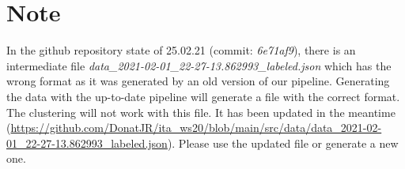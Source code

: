 \section{Note}
In the github repository state of 25.02.21 (commit: \textit{6e71af9}), there is an intermediate file \textit{data\_2021-02-01\_22-27-13.862993\_labeled.json} which has the wrong format as it was generated by an old version of our pipeline. Generating the data with the up-to-date pipeline will generate a file with the correct format. The clustering will not work with this file. It has been updated in the meantime (\url{https://github.com/DonatJR/ita_ws20/blob/main/src/data/data_2021-02-01_22-27-13.862993_labeled.json}). Please use the updated file or generate a new one.